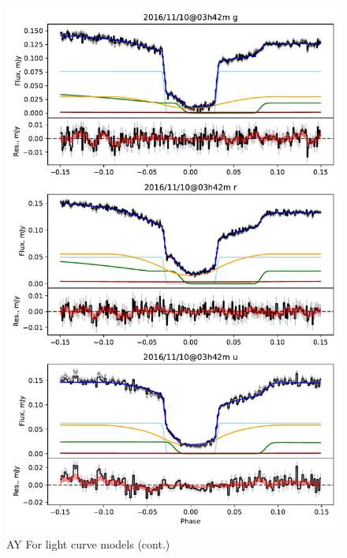 \begin{figure}
    \centering
    \includegraphics[width=\textwidth]{figures/results/AYFor/AYFor_2.pdf}
    \caption{AY For light curve models (cont.)}
    \label{fig:AYFor all light curves cont 1}
\end{figure}
